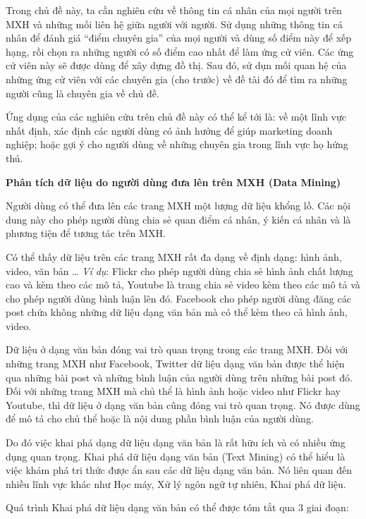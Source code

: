 \documentclass[12pt]{extarticle}
\begin{document}
			\par Trong chủ đề này, ta cần nghiên cứu về thông tin cá nhân của mọi người trên MXH và những mối liên hệ giữa người với người. Sử dụng những thông tin cá nhân để đánh giá “điểm chuyên gia” của mọi người và dùng số điểm này để xếp hạng, rồi chọn ra những người có số điểm cao nhất để làm ứng cử viên. Các ứng cử viên này sẽ được dùng để xây dựng đồ thị. Sau đó, sử dụn mối quan hệ của những ứng cử viên với các chuyên gia (cho trước) về đề tài đó để tìm ra những người cũng là chuyên gia về chủ đề.
			\par Ứng dụng của các nghiên cứu trên chủ đề này có thể kể tới là: về một lĩnh vực nhất định, xác định các người dùng có ảnh hưởng để giúp marketing doanh nghiệp; hoặc gợi ý cho người dùng về những chuyên gia trong lĩnh vực họ hứng thú.
			\par \textbf{Phân tích dữ liệu do người dùng đưa lên trên MXH (Data Mining)}
			\par Người dùng có thể đưa lên các trang MXH một lượng dữ liệu khổng lồ. Các nội dung này cho phép người dùng chia sẻ quan điểm cá nhân, ý kiến cá nhân và là phương tiện để tương tác trên MXH.
			\par Có thể thấy dữ liệu trên các trang MXH rất đa dạng về định dạng: hình ảnh, video, văn bản … \textit{Ví dụ}: Flickr cho phép người dùng chia sẻ hình ảnh chất lượng cao và kèm theo các mô tả, Youtube là trang chia sẻ video kèm theo các mô tả và cho phép người dùng bình luận lên đó. Facebook cho phép người dùng đăng các post chứa không những dữ liệu dạng văn bản mà có thể kèm theo cả hình ảnh, video.
			\par Dữ liệu ở dạng văn bản đóng vai trò quan trọng trong các trang MXH. Đối với những trang MXH như Facebook, Twitter dữ liệu dạng văn bản được thể hiện qua những bài post và những bình luận của người dùng trên những bài post đó. Đối với những trang MXH mà chủ thể là hình ảnh hoặc video như Flickr hay Youtube, thì dữ liệu ở dạng văn bản cũng đóng vai trò quan trọng. Nó được dùng để mô tả cho chủ thể hoặc là nội dung phần bình luận của người dùng.
			\par Do đó việc khai phá dạng dữ liệu dạng văn bản là rất hữu ích và có nhiều ứng dụng quan trọng. Khai phá dữ liệu dạng văn bản (Text Mining) có thể hiểu là việc khám phá tri thức được ẩn sau các dữ liệu dạng văn bản. Nó liên quan đến nhiều lĩnh vực khác như Học máy, Xử lý ngôn ngữ tự nhiên, Khai phá dữ liệu.
			\par Quá trình Khai phá dữ liệu dạng văn bản có thể được tóm tắt qua 3 giai đoạn:
\end{document}
